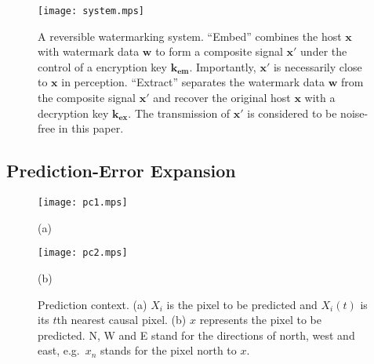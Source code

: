 \documentclass[journal]{IEEEtran}
\begin{document}
\begin{figure}[t]
    \centering
    \texttt{[image: system.mps]}
    \caption{\label{fig:wmsys}A reversible watermarking system. ``Embed'' combines the host
    $\mathbf{x}$ with watermark data $\mathbf{w}$ to form a composite signal $\mathbf{x'}$ under the
    control of a encryption key $\mathbf{k_{em}}$. Importantly, $\mathbf{x'}$ is necessarily close
    to $\mathbf{x}$ in perception. ``Extract'' separates the watermark data $\mathbf{w}$ from the
    composite signal $\mathbf{x'}$ and recover the original host $\mathbf{x}$ with a decryption key
    $\mathbf{k_{ex}}$. The transmission of $\mathbf{x'}$ is considered to be noise-free in this
    paper. }\medskip
\end{figure}

\subsection{Prediction-Error Expansion}\label{sub:pee}

\begin{figure}[t]
    \centering
  \begin{minipage}[htb]{.49\linewidth}
    \texttt{[image: pc1.mps]}
    \centerline{(a)}\medskip
  \end{minipage}
  \begin{minipage}[htb]{.49\linewidth}
    \texttt{[image: pc2.mps]}
    \centerline{(b)}\medskip
  \end{minipage}
    \caption{\label{fig:precontext}Prediction context. (a) $X_i$ is the pixel to be predicted and
    $X_i(t)$ is its $t$th nearest causal pixel. (b) $x$ represents the pixel to be predicted. N, W
    and E stand for the directions of north, west and east, e.g.\ $x_n$ stands for the pixel north
    to $x$.  }\medskip
\end{figure}
\end{document}
